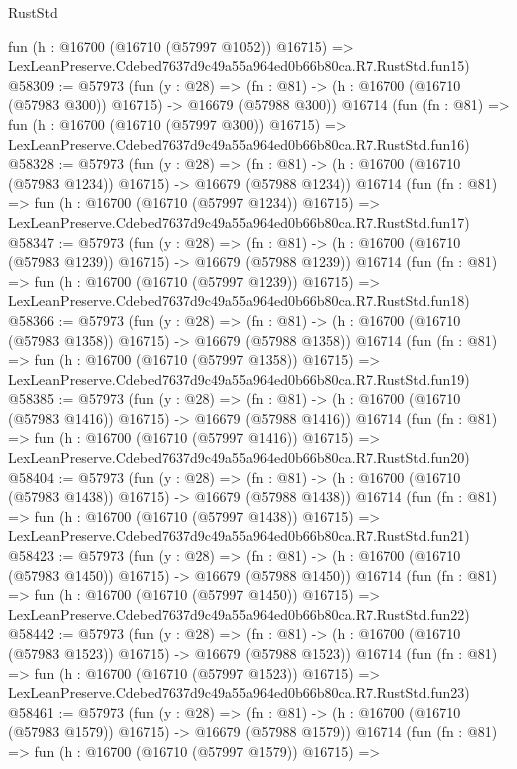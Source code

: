 \begin{lexlean}{RustStd}
\begin{coremodule}
    fun (h : @16700 (@16710 (@57997 @1052)) @16715) =>
    LexLeanPreserve.Cdebed7637d9c49a55a964ed0b66b80ca.R7.RustStd.fun15)
@58309 := @57973
    (fun (y : @28) =>
    (fn : @81) -> (h : @16700 (@16710 (@57983 @300)) @16715) -> @16679 (@57988 @300))
    @16714
    (fun (fn : @81) =>
    fun (h : @16700 (@16710 (@57997 @300)) @16715) =>
    LexLeanPreserve.Cdebed7637d9c49a55a964ed0b66b80ca.R7.RustStd.fun16)
@58328 := @57973
    (fun (y : @28) =>
    (fn : @81) -> (h : @16700 (@16710 (@57983 @1234)) @16715) -> @16679 (@57988 @1234))
    @16714
    (fun (fn : @81) =>
    fun (h : @16700 (@16710 (@57997 @1234)) @16715) =>
    LexLeanPreserve.Cdebed7637d9c49a55a964ed0b66b80ca.R7.RustStd.fun17)
@58347 := @57973
    (fun (y : @28) =>
    (fn : @81) -> (h : @16700 (@16710 (@57983 @1239)) @16715) -> @16679 (@57988 @1239))
    @16714
    (fun (fn : @81) =>
    fun (h : @16700 (@16710 (@57997 @1239)) @16715) =>
    LexLeanPreserve.Cdebed7637d9c49a55a964ed0b66b80ca.R7.RustStd.fun18)
@58366 := @57973
    (fun (y : @28) =>
    (fn : @81) -> (h : @16700 (@16710 (@57983 @1358)) @16715) -> @16679 (@57988 @1358))
    @16714
    (fun (fn : @81) =>
    fun (h : @16700 (@16710 (@57997 @1358)) @16715) =>
    LexLeanPreserve.Cdebed7637d9c49a55a964ed0b66b80ca.R7.RustStd.fun19)
@58385 := @57973
    (fun (y : @28) =>
    (fn : @81) -> (h : @16700 (@16710 (@57983 @1416)) @16715) -> @16679 (@57988 @1416))
    @16714
    (fun (fn : @81) =>
    fun (h : @16700 (@16710 (@57997 @1416)) @16715) =>
    LexLeanPreserve.Cdebed7637d9c49a55a964ed0b66b80ca.R7.RustStd.fun20)
@58404 := @57973
    (fun (y : @28) =>
    (fn : @81) -> (h : @16700 (@16710 (@57983 @1438)) @16715) -> @16679 (@57988 @1438))
    @16714
    (fun (fn : @81) =>
    fun (h : @16700 (@16710 (@57997 @1438)) @16715) =>
    LexLeanPreserve.Cdebed7637d9c49a55a964ed0b66b80ca.R7.RustStd.fun21)
@58423 := @57973
    (fun (y : @28) =>
    (fn : @81) -> (h : @16700 (@16710 (@57983 @1450)) @16715) -> @16679 (@57988 @1450))
    @16714
    (fun (fn : @81) =>
    fun (h : @16700 (@16710 (@57997 @1450)) @16715) =>
    LexLeanPreserve.Cdebed7637d9c49a55a964ed0b66b80ca.R7.RustStd.fun22)
@58442 := @57973
    (fun (y : @28) =>
    (fn : @81) -> (h : @16700 (@16710 (@57983 @1523)) @16715) -> @16679 (@57988 @1523))
    @16714
    (fun (fn : @81) =>
    fun (h : @16700 (@16710 (@57997 @1523)) @16715) =>
    LexLeanPreserve.Cdebed7637d9c49a55a964ed0b66b80ca.R7.RustStd.fun23)
@58461 := @57973
    (fun (y : @28) =>
    (fn : @81) -> (h : @16700 (@16710 (@57983 @1579)) @16715) -> @16679 (@57988 @1579))
    @16714
    (fun (fn : @81) =>
    fun (h : @16700 (@16710 (@57997 @1579)) @16715) =>

\end{coremodule}
\end{lexlean}
